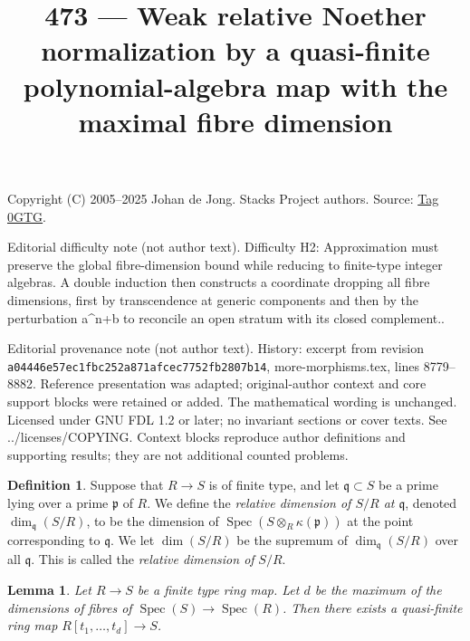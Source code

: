 \documentclass{amsart}
\theoremstyle{plain}
\newtheorem{lemma}[subsection]{Lemma}
\theoremstyle{definition}
\newtheorem{definition}[subsection]{Definition}
\theoremstyle{remark}
\numberwithin{equation}{subsection}
\def\Spec{\mathop{\mathrm{Spec}}}
\begin{document}
\title[Stacks Project, Tag 0GTG]{473 --- Weak relative Noether normalization by a quasi-finite polynomial-algebra map with the maximal fibre dimension}
\maketitle
\noindent Copyright (C) 2005--2025 Johan de Jong. Stacks Project authors. Source: \href{https://stacks.math.columbia.edu/tag/0GTG}{Tag 0GTG}.

\noindent Editorial difficulty note (not author text). Difficulty H2: Approximation must preserve the global fibre-dimension bound while reducing to finite-type integer algebras. A double induction then constructs a coordinate dropping all fibre dimensions, first by transcendence at generic components and then by the perturbation a\textasciicircum{}n+b to reconcile an open stratum with its closed complement..

\noindent Editorial provenance note (not author text). History: excerpt from revision \texttt{a0444\allowbreak 6e57e\allowbreak c1fbc\allowbreak 252a8\allowbreak 71afc\allowbreak ec775\allowbreak 2fb28\allowbreak 07b14}, more-morphisms.tex, lines 8779--8882. Reference presentation was adapted; original-author context and core support blocks were retained or added. The mathematical wording is unchanged. Licensed under GNU FDL 1.2 or later; no invariant sections or cover texts. See ../licenses/COPYING. Context blocks reproduce author definitions and supporting results; they are not additional counted problems.

\begin{definition}
\label{algebra-definition-relative-dimension}
Suppose that $R \to S$ is of finite type, and let
$\mathfrak q \subset S$ be a prime lying over a prime
$\mathfrak p$ of $R$.
We define the {\it relative dimension
of $S/R$ at $\mathfrak q$}, denoted
$\dim_{\mathfrak q}(S/R)$, to be the dimension
of $\Spec(S \otimes_R \kappa(\mathfrak p))$
at the point corresponding to $\mathfrak q$. We let
$\dim(S/R)$ be the supremum of $\dim_{\mathfrak q}(S/R)$
over all $\mathfrak q$. This is called the
{\it relative dimension of} $S/R$.
\end{definition}

\begin{lemma}
\label{lemma-weak-relative-noether-normalization}
Let $R \to S$ be a finite type ring map. Let $d$ be the maximum
of the dimensions of fibres of $\Spec(S) \to \Spec(R)$.
Then there exists a quasi-finite ring map
$R[t_1, \ldots, t_d] \to S$.
\end{lemma}
\end{document}
